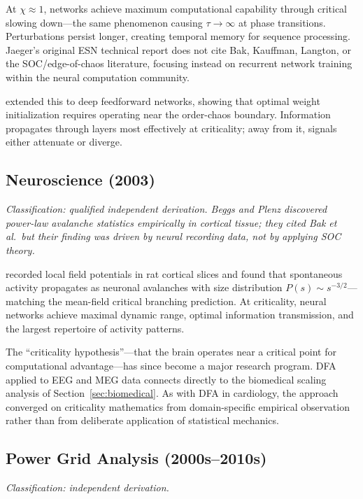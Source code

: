 \documentclass[11pt]{article}
\begin{document}
At $\chi \approx 1$, networks achieve maximum computational capability through critical slowing down---the same phenomenon causing $\tau \to \infty$ at phase transitions. Perturbations persist longer, creating temporal memory for sequence processing. Jaeger's original ESN technical report \citep{jaeger2001} does not cite Bak, Kauffman, Langton, or the SOC/edge-of-chaos literature, focusing instead on recurrent network training within the neural computation community.

\citet{saxe2013} extended this to deep feedforward networks, showing that optimal weight initialization requires operating near the order-chaos boundary. Information propagates through layers most effectively at criticality; away from it, signals either attenuate or diverge.

\subsection{Neuroscience (2003)}

\noindent\textit{Classification: qualified independent derivation. Beggs and Plenz discovered power-law avalanche statistics empirically in cortical tissue; they cited Bak et al.\ but their finding was driven by neural recording data, not by applying SOC theory.}
\smallskip

\citet{beggs2003} recorded local field potentials in rat cortical slices and found that spontaneous activity propagates as neuronal avalanches with size distribution $P(s) \sim s^{-3/2}$---matching the mean-field critical branching prediction. At criticality, neural networks achieve maximal dynamic range, optimal information transmission, and the largest repertoire of activity patterns.

The ``criticality hypothesis''---that the brain operates near a critical point for computational advantage---has since become a major research program. DFA applied to EEG and MEG data connects directly to the biomedical scaling analysis of Section~\ref{sec:biomedical}. As with DFA in cardiology, the approach converged on criticality mathematics from domain-specific empirical observation rather than from deliberate application of statistical mechanics.

\subsection{Power Grid Analysis (2000s--2010s)}

\noindent\textit{Classification: independent derivation.}
\smallskip
\end{document}
